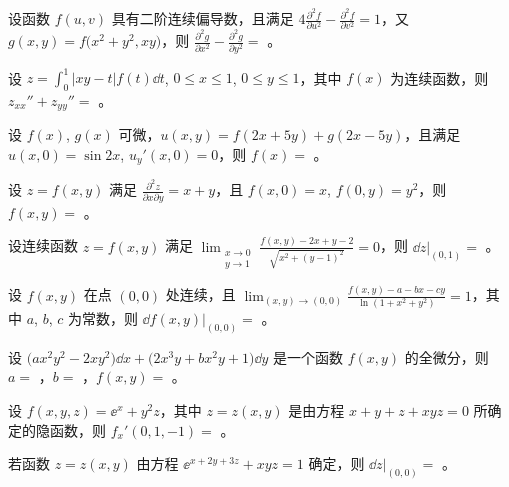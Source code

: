 \begin{ti}
	设函数 $f(u,v)$ 具有二阶连续偏导数，且满足 $4 \frac{\partial^2f}{\partial u^2} - \frac{\partial^2f}{\partial v^2} = 1$，又 $g(x,y) = f\bigl(x^2 + y^2,xy \bigr)$，则 $\frac{\partial^2g}{\partial x^2} - \frac{\partial^2g}{\partial y^2} = $ \hua。
\end{ti}

\begin{ti}
	设 $z = \int_0^1 |xy - t| f(t) \dd{t}$, $0 \leq x \leq 1$, $0 \leq y \leq 1$，其中 $f(x)$ 为连续函数，则 $z_{xx}'' + z_{yy}'' = $ \hua。
\end{ti}

\begin{ti}
	设 $f(x)$, $g(x)$ 可微，$u(x,y) = f(2x+5y) + g(2x-5y)$，且满足 $u(x,0) = \sin 2x$, $u_y'(x,0) = 0$，则 $f(x) = $ \hua。
\end{ti}

\begin{ti}
	设 $z = f(x,y)$ 满足 $\frac{\partial^2z}{\partial x \partial y} = x + y$，且 $f(x,0) = x$, $f(0,y) = y^2$，则 $f(x,y) = $ \hua。
\end{ti}

\begin{ti}
	设连续函数 $z = f(x,y)$ 满足 $\lim_{\substack{x \to 0\\y \to 1}} \frac{f(x,y) - 2x + y - 2}{\sqrt{x^2 + (y-1)^2}} = 0$，则 $\dd{z}|_{(0,1)} = $ \hua。
\end{ti}

\begin{ti}
	设 $f(x,y)$ 在点 $(0,0)$ 处连续，且 $\lim_{(x,y) \to (0,0)} \frac{f(x,y) - a - bx - cy}{\ln(1 + x^2 + y^2)} = 1$，其中 $a$, $b$, $c$ 为常数，则 $\dd{f(x,y)}|_{(0,0)} = $ \hua。
\end{ti}

\begin{ti}
	设 $\bigl( ax^2 y^2 - 2xy^2 \bigr) \dd{x} + \bigl( 2x^3 y + bx^2 y + 1 \bigr) \dd{y}$ 是一个函数 $f(x,y)$ 的全微分，则 $a = $ \hua，$b = $ \hua，$f(x,y) = $ \hua。
\end{ti}

\begin{ti}
	设 $f(x,y,z) = \ee^x + y^2 z$，其中 $z = z(x,y)$ 是由方程 $x + y + z + xyz = 0$ 所确定的隐函数，则 $f_x'(0,1,-1) = $ \hua。
\end{ti}

\begin{ti}
	若函数 $z = z(x,y)$ 由方程 $\ee^{x+2y+3z} + xyz = 1$ 确定，则 $\dd{z}|_{(0,0)} = $ \hua。
\end{ti}

